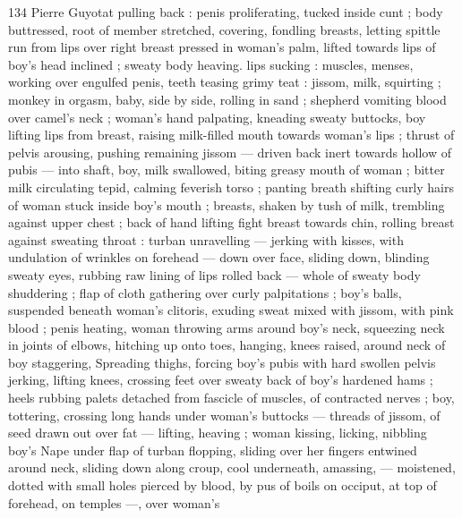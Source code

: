 134 Pierre Guyotat
pulling back : penis proliferating, tucked inside cunt ; body
buttressed, root of member stretched, covering, fondling breasts,
letting spittle run from lips over right breast pressed in woman's
palm, lifted towards lips of boy's head inclined ; sweaty body
heaving. lips sucking : muscles, menses, working over engulfed
penis, teeth teasing grimy teat : jissom, milk, squirting ; monkey in
orgasm, baby, side by side, rolling in sand ; shepherd vomiting blood
over camel's neck ; woman's hand palpating, kneading sweaty
buttocks, boy lifting lips from breast, raising milk-filled mouth
towards woman's lips ; thrust of pelvis arousing, pushing remaining
jissom — driven back inert towards hollow of pubis — into shaft,
boy, milk swallowed, biting greasy mouth of woman ; bitter milk
circulating tepid, calming feverish torso ; panting breath shifting
curly hairs of woman stuck inside boy's mouth ; breasts, shaken by
tush of milk, trembling against upper chest ; back of hand lifting
fight breast towards chin, rolling breast against sweating throat :
turban unravelling — jerking with kisses, with undulation of wrinkles
on forehead — down over face, sliding down, blinding sweaty eyes,
rubbing raw lining of lips rolled back — whole of sweaty body
shuddering ; flap of cloth gathering over curly palpitations ; boy's
balls, suspended beneath woman's clitoris, exuding sweat mixed with
jissom, with pink blood ; penis heating, woman throwing arms around
boy's neck, squeezing neck in joints of elbows, hitching up onto
toes, hanging, knees raised, around neck of boy staggering,
Spreading thighs, forcing boy's pubis with hard swollen pelvis
jerking, lifting knees, crossing feet over sweaty back of boy's
hardened hams ; heels rubbing palets detached from fascicle of
muscles, of contracted nerves ; boy, tottering, crossing long hands
under woman's buttocks — threads of jissom, of seed drawn out
over fat — lifting, heaving ; woman kissing, licking, nibbling boy's
Nape under flap of turban flopping, sliding over her fingers entwined
around neck, sliding down along croup, cool underneath, amassing,
— moistened, dotted with small holes pierced by blood, by pus of
boils on occiput, at top of forehead, on temples —, over woman's

